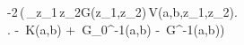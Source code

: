-2\,\left(\,\int_{z_{1}\,z_{2}}\mathcal G(z_{1},z_{2})\,\mathcal V(a,b,z_{1},z_{2})\right. \\ \qquad\left. - \,K(a,b) + \,\mathcal G_0^{-1}(a,b) - \,\mathcal G^{-1}(a,b)\right)
